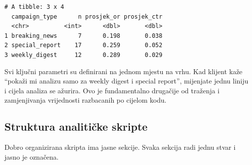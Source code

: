 \documentclass[
  croatian,
  letterpaper,
  DIV=11,
  numbers=noendperiod]{scrartcl}
\begin{document}
\begin{verbatim}
# A tibble: 3 x 4
  campaign_type      n prosjek_or prosjek_ctr
  <chr>          <int>      <dbl>       <dbl>
1 breaking_news      7      0.198       0.038
2 special_report    17      0.259       0.052
3 weekly_digest     12      0.289       0.029
\end{verbatim}

Svi ključni parametri su definirani na jednom mjestu na vrhu. Kad
klijent kaže ``pokaži mi analizu samo za weekly digest i special
report'', mijenjate jednu liniju i cijela analiza se ažurira. Ovo je
fundamentalno drugačije od traženja i zamjenjivanja vrijednosti
razbacanih po cijelom kodu.

\subsection{Struktura analitičke
skripte}\label{struktura-analitiux10dke-skripte}

Dobro organizirana skripta ima jasne sekcije. Svaka sekcija radi jednu
stvar i jasno je označena.
\end{document}

